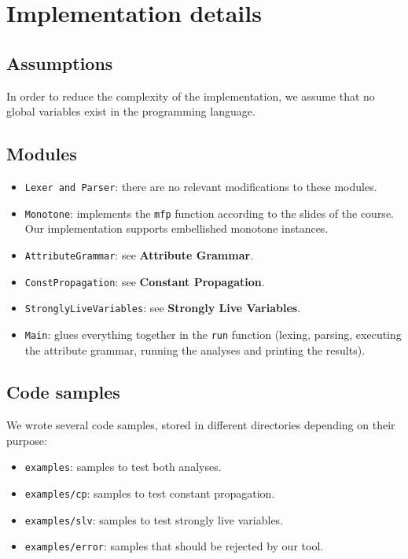 \documentclass{article}
\begin{document}
\section{Implementation details}


\subsection*{Assumptions}

In order to reduce the complexity of the implementation, we assume that no global variables exist in the programming language.

\subsection*{Modules}

\begin{itemize}
	\item \texttt{Lexer and Parser}: there are no relevant modifications to these modules.
	\item \texttt{Monotone}: implements the \texttt{mfp} function according to the slides of the course. Our implementation supports embellished monotone instances.
	\item \texttt{AttributeGrammar}: see \textbf{Attribute Grammar}.
	\item \texttt{ConstPropagation}: see \textbf{Constant Propagation}.
	\item \texttt{StronglyLiveVariables}: see \textbf{Strongly Live Variables}.
	\item \texttt{Main}: glues everything together in the \texttt{run} function (lexing, parsing, executing the attribute grammar, running the analyses and printing the results).
\end{itemize}

\subsection*{Code samples}

We wrote several code samples, stored in different directories depending on their purpose:

\begin{itemize}
	\item \texttt{examples}: samples to test both analyses.
	\item \texttt{examples/cp}: samples to test constant propagation.
	\item \texttt{examples/slv}: samples to test strongly live variables.
	\item \texttt{examples/error}: samples that should be rejected by our tool.
\end{itemize}
\end{document}
